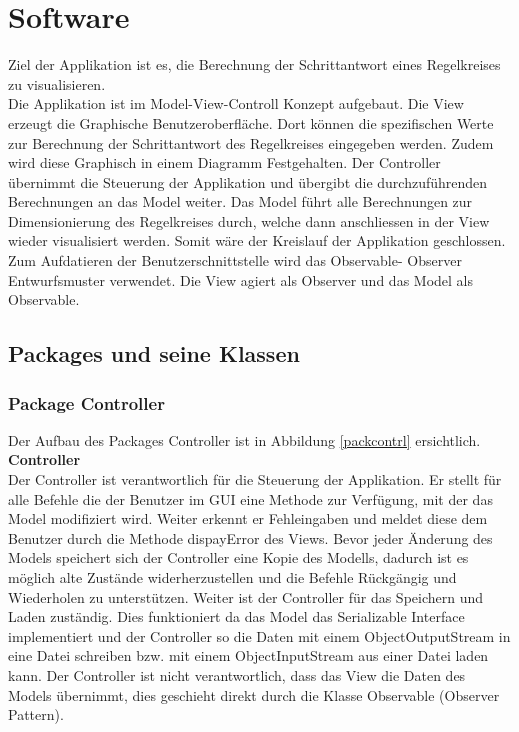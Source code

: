 \section{Software}
Ziel der Applikation ist es, die Berechnung der Schrittantwort eines Regelkreises zu visualisieren.\\
Die Applikation ist im Model-View-Controll Konzept aufgebaut. Die View erzeugt die Graphische Benutzeroberfläche. Dort können die spezifischen Werte zur Berechnung der Schrittantwort des Regelkreises eingegeben werden. Zudem wird diese Graphisch in einem Diagramm Festgehalten. Der Controller übernimmt die Steuerung der Applikation und übergibt die durchzuführenden Berechnungen an das Model weiter. Das Model führt alle Berechnungen zur Dimensionierung des Regelkreises durch, welche dann anschliessen in der View wieder visualisiert werden. Somit wäre der Kreislauf der Applikation geschlossen.\\
Zum Aufdatieren der Benutzerschnittstelle wird das Observable- Observer Entwurfsmuster verwendet. Die View agiert als Observer und das Model als Observable.


\subsection{Packages und seine Klassen}

\subsubsection{Package Controller}
Der Aufbau des Packages Controller ist in Abbildung \ref{packcontrl} ersichtlich.\\

\textbf{Controller}\\
Der Controller ist verantwortlich für die Steuerung der Applikation. Er stellt für alle Befehle die der Benutzer im GUI eine Methode zur Verfügung, mit der das Model modifiziert wird. Weiter erkennt er Fehleingaben und meldet diese dem Benutzer durch die Methode dispayError des Views. Bevor jeder Änderung des Models speichert sich der Controller eine Kopie des Modells, dadurch ist es möglich alte Zustände widerherzustellen und die Befehle Rückgängig und Wiederholen zu unterstützen. Weiter ist der Controller für das Speichern und Laden zuständig. Dies funktioniert da das Model das Serializable Interface implementiert und der Controller so die Daten mit einem ObjectOutputStream in eine Datei schreiben bzw. mit einem ObjectInputStream aus einer Datei laden kann. Der Controller ist nicht verantwortlich, dass das View die Daten des Models übernimmt, dies geschieht direkt durch die Klasse Observable (Observer Pattern).\\

